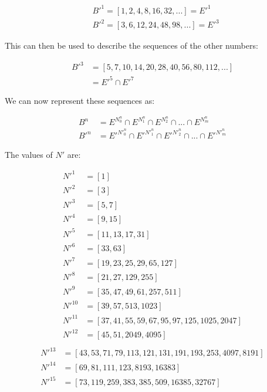 \documentclass{article}
\begin{document}
\begin{displaymath}\begin{aligned}
& B'^1 = [1, 2,  4,  8, 16, 32, ...] = E'^1 \\
& B'^2 = [3, 6, 12, 24, 48, 98, ...] = E'^3
\end{aligned}\end{displaymath}

\noindent
This can then be used to describe the sequences of the other numbers:

\begin{displaymath}\begin{aligned}
B'^3
& = [5, 7, 10, 14, 20, 28, 40, 56, 80, 112, ...] \\
& = E'^5 \cap E'^7
\end{aligned}\end{displaymath}

\noindent
We can now represent these sequences as:

\begin{displaymath}\begin{aligned}
B^n  & = E^{N^n_0}   \cap E^{N^n_1}   \cap E^{N^n_2}   \cap ... \cap E^{N^n_m} \\
B'^n & = E'^{N'^n_0} \cap E'^{N'^n_1} \cap E'^{N'^n_2} \cap ... \cap E'^{N'^n_m}
\end{aligned}\end{displaymath}

\noindent
The values of \begin{math}N'\end{math} are:

\begin{displaymath}\begin{aligned}
N'^{1}  & = [1] \\
N'^{2}  & = [3] \\
N'^{3}  & = [5, 7] \\
N'^{4}  & = [9, 15] \\
N'^{5}  & = [11, 13, 17, 31] \\
N'^{6}  & = [33, 63] \\
N'^{7}  & = [19, 23, 25, 29, 65, 127] \\
N'^{8}  & = [21, 27, 129, 255] \\
N'^{9}  & = [35, 47, 49, 61, 257, 511] \\
N'^{10} & = [39, 57, 513, 1023] \\
N'^{11} & = [37, 41, 55, 59, 67, 95, 97, 125, 1025, 2047] \\
N'^{12} & = [45, 51, 2049, 4095] \\
\end{aligned}\end{displaymath}
\begin{displaymath}\begin{aligned}
N'^{13} & = [43, 53, 71, 79, 113, 121, 131, 191, 193, 253, 4097, 8191] \\
N'^{14} & = [69, 81, 111, 123, 8193, 16383] \\
N'^{15} & = [73, 119, 259, 383, 385, 509, 16385, 32767] \\
\end{aligned}\end{displaymath}
\end{document}
